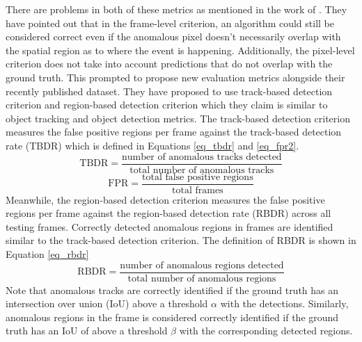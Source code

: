 There are problems in both of these metrics as mentioned in the work of . They have pointed out that in the frame-level criterion, an algorithm could still be considered correct even if the anomalous pixel doesn't necessarily overlap with the spatial region as to where the event is happening. Additionally, the pixel-level criterion does not take into account predictions that do not overlap with the ground truth. This prompted  to propose new evaluation metrics alongside their recently published dataset. They have proposed to use track-based detection criterion and region-based detection criterion which they claim is similar to object tracking and object detection metrics. The track-based detection criterion measures the false positive regions per frame against the track-based detection rate (TBDR) which is defined in Equations \ref{eq_tbdr} and \ref{eq_fpr2}.
\begin{equation}\label{eq_tbdr}
    \mbox{TBDR} = \frac{\mbox{number of anomalous tracks detected}}{\mbox{total number of anomalous tracks}}
\end{equation}
\begin{equation}\label{eq_fpr2}
    \mbox{FPR} = \frac{\mbox{total false positive regions}}{\mbox{total frames}}
\end{equation}
Meanwhile, the region-based detection criterion measures the false positive regions per frame against the region-based detection rate (RBDR) across all testing frames. Correctly detected anomalous regions in frames are identified similar to the track-based detection criterion. The definition of RBDR is shown in Equation \ref{eq_rbdr}
\begin{equation}\label{eq_rbdr}
\mbox{RBDR} = \frac{\mbox{number of anomalous regions detected}}{\mbox{total number of anomalous regions}}
\end{equation}
Note that anomalous tracks are correctly identified if the ground truth has an intersection over union (IoU) above a threshold $\alpha$ with the detections. Similarly, anomalous regions in the frame is considered correctly identified if the ground truth has an IoU of above a threshold $\beta$ with the corresponding detected regions.

